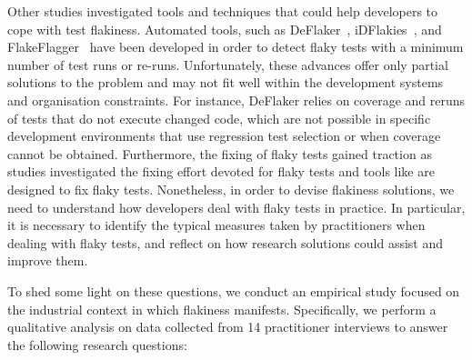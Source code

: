 Other studies investigated tools and techniques that could help developers to cope with test flakiness.
Automated tools, such as DeFlaker~\cite{bell_deflaker_2018}, iDFlakies~\cite{lam_idflakies_2019}, and FlakeFlagger~\cite{alshammari2021flakeflagger} have been developed in order to detect flaky tests with a minimum number of test runs or re-runs. Unfortunately, these advances offer only partial solutions to the problem and may not fit well within the development systems and organisation constraints. For instance, DeFlaker relies on coverage and reruns of tests that do not execute changed code, which are not possible in specific development environments that use regression test selection or when coverage cannot be obtained.     
Furthermore, the fixing of flaky tests gained traction as studies investigated the fixing effort devoted for flaky tests and tools like \cite{shi_ifixflakies_2019} are designed to fix flaky tests.
Nonetheless, in order to devise flakiness solutions, we need to understand how developers deal with flaky tests in practice.
In particular, it is necessary to identify the typical measures taken by practitioners when dealing with flaky tests, and reflect on how research solutions could assist and improve them.

To shed some light on these questions, we conduct an empirical study focused on the industrial context in which flakiness manifests. %
Specifically, we perform a qualitative analysis on data collected from 14 practitioner interviews to answer the following research questions:


